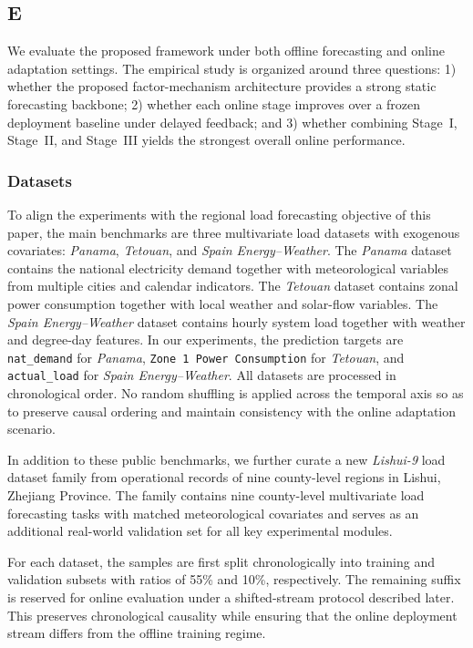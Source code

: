 ﻿\documentclass[journal]{IEEEtran}
\newenvironment{auditproblemblock}{\begingroup\color{red}}{\endgroup}
\begin{document}
\subsection{E}
\begin{auditproblemblock}
We evaluate the proposed framework under both offline forecasting and online adaptation settings. The empirical study is organized around three questions: 1) whether the proposed factor-mechanism architecture provides a strong static forecasting backbone; 2) whether each online stage improves over a frozen deployment baseline under delayed feedback; and 3) whether combining Stage~I, Stage~II, and Stage~III yields the strongest overall online performance.

\subsubsection{Datasets}
To align the experiments with the regional load forecasting objective of this paper, the main benchmarks are three multivariate load datasets with exogenous covariates: \textit{Panama}, \textit{Tetouan}, and \textit{Spain Energy--Weather}. The \textit{Panama} dataset contains the national electricity demand together with meteorological variables from multiple cities and calendar indicators. The \textit{Tetouan} dataset contains zonal power consumption together with local weather and solar-flow variables. The \textit{Spain Energy--Weather} dataset contains hourly system load together with weather and degree-day features. In our experiments, the prediction targets are \texttt{nat\_demand} for \textit{Panama}, \texttt{Zone 1 Power Consumption} for \textit{Tetouan}, and \texttt{actual\_load} for \textit{Spain Energy--Weather}. All datasets are processed in chronological order. No random shuffling is applied across the temporal axis so as to preserve causal ordering and maintain consistency with the online adaptation scenario.

In addition to these public benchmarks, we further curate a new \textit{Lishui-9} load dataset family from operational records of nine county-level regions in Lishui, Zhejiang Province. The family contains nine county-level multivariate load forecasting tasks with matched meteorological covariates and serves as an additional real-world validation set for all key experimental modules.

For each dataset, the samples are first split chronologically into training and validation subsets with ratios of 55\% and 10\%, respectively. The remaining suffix is reserved for online evaluation under a shifted-stream protocol described later. This preserves chronological causality while ensuring that the online deployment stream differs from the offline training regime.


\end{auditproblemblock}
\end{document}
